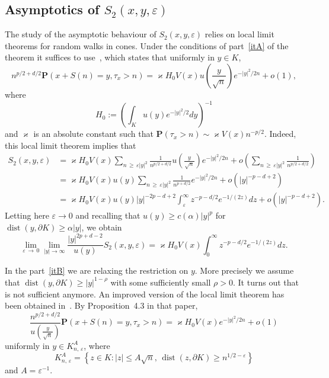 \documentclass[AHL,Unicode,longabstracts,published]{cedram}
\DeclareMathOperator{\dist}{dist}
\newcommand{\pr}{\mathbf{P}}
\renewcommand{\epsilon}{\varepsilon}
\renewcommand{\ge}{\geqslant}
\renewcommand{\leq}{\leqslant}
\renewcommand{\geq}{\geqslant}
\begin{document}
\subsection*{Asymptotics of \texorpdfstring{$S_2(x,y,\varepsilon)$}{S2(x,y, varepsilon)}}
The study of the asymptotic behaviour of $S_2(x,y,\varepsilon)$ relies on local limit theorems for random walks in cones. Under the conditions of part~\eqref{itA} of the theorem it suffices to use~\cite[Theorem~5]{DeWa-15}, which states that uniformly in $y\in K$,
\begin{equation}\label{eq:llt}
n^{p/2+d/2}\pr\left(x+S(n)=y,\tau_x>n\right)=
\varkappa H_0 V(x)u\left(\frac{y}{\sqrt{n}}\right)e^{-| y|^2/2n}+o(1),
\end{equation}
where
\[
H_0:=\left(\int_K u(y)e^{-|y|^2/2}dy\right)^{-1}
\]
and $\varkappa$ is an absolute constant such that $\pr(\tau_x>n)\sim\varkappa V(x)n^{-p/2}$. Indeed, this local limit theorem implies that
\begin{align*}
S_2(x,y,\varepsilon) &=\varkappa H_0 V(x)\sum_{n\,\ge\,\varepsilon|y|^2}\frac{1}{n^{p/2+d/2}} u\left(\frac{y}{\sqrt{n}}\right)e^{-|y|^2/2n}+ o\left(\sum_{n\,\ge\,\varepsilon|y|^2}\frac{1}{n^{p/2+d/2}}\right)\\
&=\varkappa H_0 V(x)u(y)\sum_{n\,\ge\,\varepsilon|y|^2}\frac{1}{n^{p+d/2}}e^{-|y|^2/2n}+ o\left(|y|^{-p-d+2}\right)\\
&=\varkappa H_0 V(x)u(y)|y|^{-2p-d+2}\int_\varepsilon^\infty z^{-p-d/2}e^{-1/(2z)}dz+ o\left(|y|^{-p-d+2}\right).
\end{align*}
Letting here $\varepsilon\to0$ and recalling that $u(y)\ge c(\alpha)|y|^p$ for $\dist(y,\partial K)\ge \alpha|y|$, we obtain
\begin{equation}\label{lim_S_2}
\lim_{\varepsilon\,\to\,0}\lim_{|y|\to\infty}\frac{|y|^{2p+d-2}}{u(y)}S_2(x,y,\varepsilon) =\varkappa H_0 V(x)\int_0^\infty z^{-p-d/2}e^{-1/(2z)}dz.
\end{equation}

In the part~\eqref{itB} we are relaxing the restriction on $y$. More precisely we assume that $\dist(y,\partial K)\ge |y|^{1-\rho}$ with some sufficiently small $\rho>0$. It turns out that~\cite[Theorem~5]{DeWa-15} is not sufficient anymore. An improved version of the local limit theorem has been obtained in~\cite{RaTa-20}. By Proposition~4.3 in that paper,
\[
\frac{n^{p/2+d/2}}{u\left(\frac{y}{\sqrt{n}}\right)}\pr\left(x+S(n)=y,\tau_x>n\right)=
\varkappa H_0 V(x)e^{-| y|^2/2n}+o(1)
\]
uniformly in $y\in K_{n,\,\epsilon}^{A}$, where
\begin{equation}\label{eq:def_K_n,e,A}
K_{n,\,\epsilon}^{A}=\left\{z\in K: | z| \leq A\sqrt{n},\, \dist(z,\partial K)\geq n^{1/2-\epsilon}\right\}
\end{equation}
and $A=\varepsilon^{-1}$.
\end{document}
